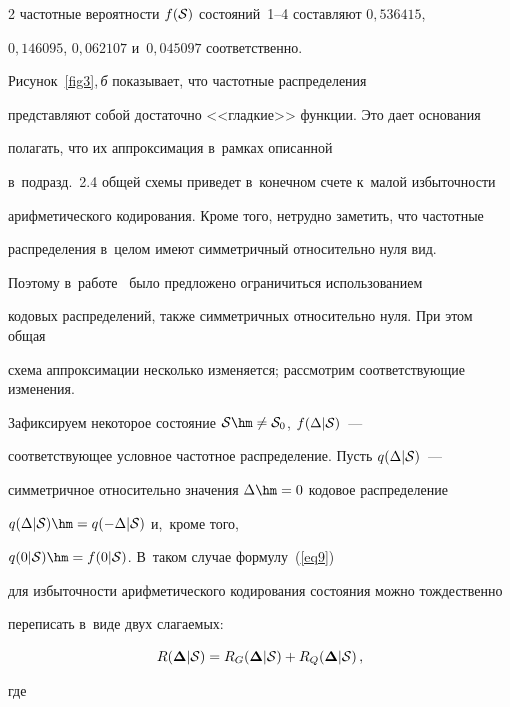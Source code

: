 \begin{multicols}{2}
частотные вероятности $f({\cal S})$ состояний~1--4 со\-став\-ля\-ют $0{,}536415$, 

$0{,}146095$, $0{,}062107$ и~$0{,}045097$ соответственно.



Рисунок~\ref{fig3},\,\textit{б} показывает, что частотные распределения 

представляют собой достаточно <<гладкие>> функции. Это дает основания 

полагать, что их аппроксимация в~рамках описанной 

в~подразд.~2.4 общей схемы приведет в~конечном счете к~малой избыточности 

арифметического кодирования.  Кроме того, нетрудно заметить, что частотные 

распределения в~целом имеют симметричный относительно нуля вид. 

Поэтому в~работе~\cite{b01} было предложено ограничиться использованием 

кодовых распределений, также симметричных относительно нуля. При этом общая 

схема аппроксимации несколько изменяется; рассмотрим соответствующие изменения.



Зафиксируем некоторое состояние ${\cal S}\hm\neq{\cal S}_0$, $f(\Delta|{\cal S})$~--- 

соответствующее условное частотное распределение. Пусть $q(\Delta|{\cal S})$~---  

симметричное относительно значения $\Delta\hm= 0$  кодовое распределение 

$q(\Delta|{\cal S})\hm= q(-\Delta|{\cal S})$ и,~кроме того, 

$q(0|{\cal S})\hm= f(0|{\cal S})$. В~таком случае формулу~(\ref{eq9})

 для избыточности арифметического кодирования состояния можно тождественно 

 переписать в~виде двух слагаемых:

\begin{equation}

\label{eq27}

R(\boldsymbol{\Delta}|{\cal S}) =

R_G(\boldsymbol{\Delta}|{\cal S)} + R_Q(\boldsymbol{\Delta}|{\cal S)} \,,

\end{equation}

где

\begin{equation}


\end{equation}
\end{multicols}
